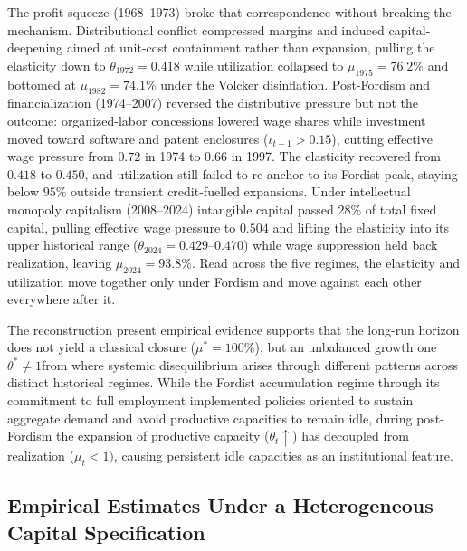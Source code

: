 The profit squeeze (1968--1973) broke that correspondence without
breaking the mechanism. Distributional conflict compressed margins and
induced capital-deepening aimed at unit-cost containment rather than
expansion, pulling the elasticity down to $\theta_{1972} = 0.418$ while
utilization collapsed to $\mu_{1975} = 76.2\%$ and bottomed at
$\mu_{1982} = 74.1\%$ under the Volcker disinflation. Post-Fordism and
financialization (1974--2007) reversed the distributive pressure but not
the outcome: organized-labor concessions lowered wage shares while
investment moved toward software and patent enclosures
($\iota_{t-1} > 0.15$), cutting effective wage pressure from $0.72$ in
1974 to $0.66$ in 1997. The elasticity recovered from $0.418$ to
$0.450$, and utilization still failed to re-anchor to its Fordist peak,
staying below $95\%$ outside transient credit-fuelled expansions. Under
intellectual monopoly capitalism (2008--2024) intangible capital passed
$28\%$ of total fixed capital, pulling effective wage pressure to
$0.504$ and lifting the elasticity into its upper historical range
($\theta_{2024} = 0.429$--$0.470$) while wage suppression held back
realization, leaving $\mu_{2024} = 93.8\%$. Read across the five
regimes, the elasticity and utilization move together only under Fordism
and move against each other everywhere after it.

The reconstruction present empirical evidence supports that the long-run horizon does not yield a classical closure ($\mu^* = 100\%$), 
but an unbalanced growth one $\theta^* \neq 1 $from where systemic disequilibrium arises through different patterns across distinct historical regimes.  
While the Fordist accumulation regime through its commitment to full employment implemented policies oriented to sustain aggregate demand and avoid productive capacities to remain idle, during post-Fordism the expansion of productive capacity ($\theta_t \uparrow$) has decoupled from realization ($\mu_t<1)$, causing persistent idle capacities as an institutional feature.


\subsection{Empirical Estimates Under a Heterogeneous Capital Specification}
\label{sec:432:specB_results}


